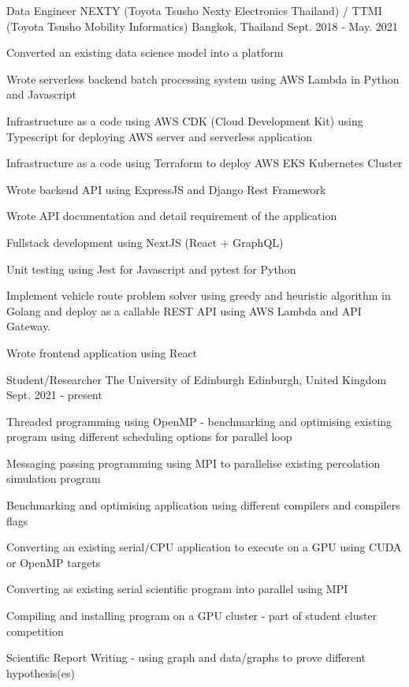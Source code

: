 \begin{cventries}
  \cventry
    {Data Engineer} %
    {NEXTY (Toyota Tsusho Nexty Electronics Thailand) / TTMI (Toyota Tsusho Mobility Informatics)} %
    {Bangkok, Thailand} %
    {Sept. 2018 - May. 2021} %
    {
      \begin{cvitems} %
        \item {Converted an existing data science model into a platform}
        \item {Wrote serverless backend batch processing system using AWS Lambda in Python and Javascript}
        \item {
          Infrastructure as a code using AWS CDK (Cloud Development Kit) using
          Typescript for deploying AWS server and serverless application
        }
        \item {
          Infrastructure as a code using Terraform to deploy AWS EKS Kubernetes Cluster 
        }
        \item {Wrote backend API using ExpressJS and Django Rest Framework}
        \item {Wrote API documentation and detail requirement of the application}
        \item {Fullstack development using NextJS (React + GraphQL)}
        \item {Unit testing using Jest for Javascript and pytest for Python}
        \item Implement vehicle route problem solver using greedy and heuristic algorithm in Golang and deploy as a callable REST API using AWS Lambda and API Gateway. 
        \item {Wrote frontend application using React}
      \end{cvitems}
    }
  \cventry
  {Student/Researcher} %
  {The University of Edinburgh} %
  {Edinburgh, United Kingdom} %
  {Sept. 2021 - present} %
  {
    \begin{cvitems} %
      \item {Threaded programming using OpenMP - benchmarking and optimising existing program using different scheduling options for parallel loop}
      \item {Messaging passing programming using MPI to parallelise existing percolation simulation program}
      \item {Benchmarking and optimising application using different compilers and compilers flags}
      \item {Converting an existing serial/CPU application to execute on a GPU using CUDA or OpenMP targets}
      \item {Converting as existing serial scientific program into parallel using MPI}
      \item {Compiling and installing program on a GPU cluster - part of student cluster competition}
      \item {Scientific Report Writing - using graph and data/graphs to prove different hypothesis(es)}
    \end{cvitems}
  }
\end{cventries}
